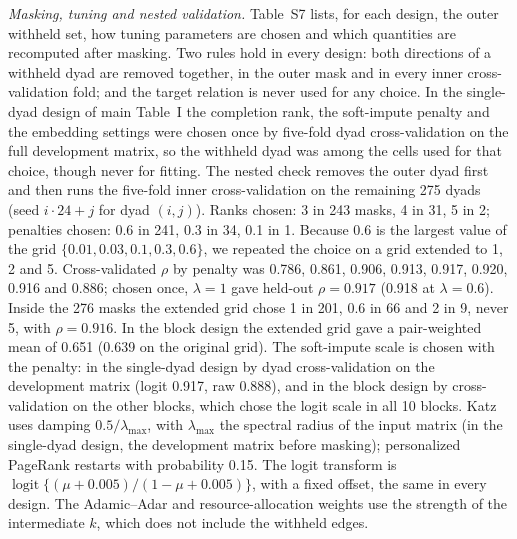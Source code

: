 \documentclass[journal]{IEEEtran}
\begin{document}
\emph{Masking, tuning and nested validation.} Table~S7 lists, for each design, the outer withheld set, how tuning parameters are chosen and which quantities are recomputed after masking. Two rules hold in every design: both directions of a withheld dyad are removed together, in the outer mask and in every inner cross-validation fold; and the target relation is never used for any choice. In the single-dyad design of main Table~I the completion rank, the soft-impute penalty and the embedding settings were chosen once by five-fold dyad cross-validation on the full development matrix, so the withheld dyad was among the cells used for that choice, though never for fitting. The nested check removes the outer dyad first and then runs the five-fold inner cross-validation on the remaining 275 dyads (seed $i\cdot24+j$ for dyad $(i,j)$). Ranks chosen: 3 in 243 masks, 4 in 31, 5 in 2; penalties chosen: 0.6 in 241, 0.3 in 34, 0.1 in 1. Because 0.6 is the largest value of the grid $\{0.01,0.03,0.1,0.3,0.6\}$, we repeated the choice on a grid extended to 1, 2 and 5. Cross-validated $\rho$ by penalty was 0.786, 0.861, 0.906, 0.913, 0.917, 0.920, 0.916 and 0.886; chosen once, $\lambda=1$ gave held-out $\rho=0.917$ (0.918 at $\lambda=0.6$). Inside the 276 masks the extended grid chose 1 in 201, 0.6 in 66 and 2 in 9, never 5, with $\rho=0.916$. In the block design the extended grid gave a pair-weighted mean of 0.651 (0.639 on the original grid). The soft-impute scale is chosen with the penalty: in the single-dyad design by dyad cross-validation on the development matrix (logit 0.917, raw 0.888), and in the block design by cross-validation on the other blocks, which chose the logit scale in all 10 blocks. Katz uses damping $0.5/\lambda_{\max}$, with $\lambda_{\max}$ the spectral radius of the input matrix (in the single-dyad design, the development matrix before masking); personalized PageRank restarts with probability 0.15. The logit transform is $\operatorname{logit}\{(\mu+0.005)/(1-\mu+0.005)\}$, with a fixed offset, the same in every design. The Adamic--Adar and resource-allocation weights use the strength of the intermediate $k$, which does not include the withheld edges.
\end{document}
